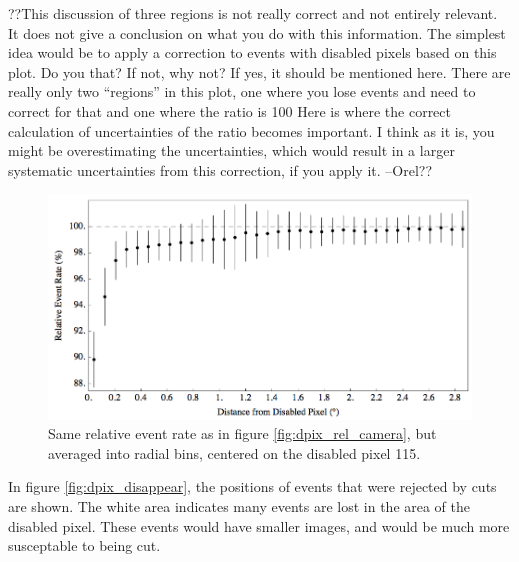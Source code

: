 ??This discussion of three regions is not really correct and not entirely relevant.
It does not give a conclusion on what you do with this information.
The simplest idea would be to apply a correction to events with disabled pixels based on this plot. Do you that? If not, why not? If yes, it should be mentioned here.
There are really only two “regions” in this plot, one where you lose events and need to correct for that and one where the ratio is 100%
Here is where the correct calculation of uncertainties of the ratio becomes important.
I think as it is, you might be overestimating the uncertainties, which would result in a larger systematic uncertainties from this correction, if you apply it. --Orel??


\begin{figure}[ht]
  \begin{center}
    \includegraphics[width=\textwidth]{images/disabled_pixel/relativerate_radial}
    \caption[Radial Relative Event Rate]{Same relative event rate as in figure \ref{fig:dpix_rel_camera}, but averaged into radial bins, centered on the disabled pixel 115. }\label{fig:dpix_rel_radial}
  \end{center}
\end{figure}

In figure \ref{fig:dpix_disappear}, the positions of events that were rejected by cuts are shown.
The white area indicates many events are lost in the area of the disabled pixel.
These events would have smaller images, and would be much more susceptable to being cut.

